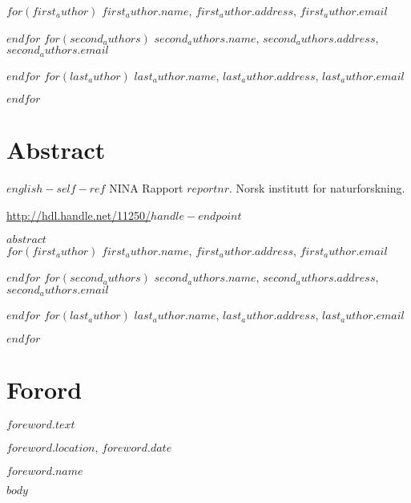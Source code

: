 \documentclass[11pt, a4paper]{article}
\renewcommand*{\href}[2]{\hyperref[#1]{\color{darkblue}\setulcolor{darkblue}\ul{#2}}}
\begin{document}
\vspace{1cm}
\small
$for(first_author)$
$first_author.name$, $first_author.address$, $first_author.email$  \par
$endfor$
$for(second_authors)$
$second_authors.name$, $second_authors.address$, $second_authors.email$  \par
$endfor$
$for(last_author)$
$last_author.name$, $last_author.address$, $last_author.email$  \par
$endfor$
\normalsize
\clearpage

\setcounter{secnumdepth}{0}
\section{Abstract}
\small{$english-self-ref$} NINA Rapport $reportnr$. Norsk institutt for naturforskning. \par\href{http://hdl.handle.net/11250/$handle-endpoint$}{http://hdl.handle.net/11250/$handle-endpoint$}\par
\vspace{0.5cm}
\normalsize{
$abstract$} \\

\vspace{1cm}
\small
$for(first_author)$
$first_author.name$, $first_author.address$, $first_author.email$  \par
$endfor$
$for(second_authors)$
$second_authors.name$, $second_authors.address$, $second_authors.email$  \par
$endfor$
$for(last_author)$
$last_author.name$, $last_author.address$, $last_author.email$  \par
$endfor$
\normalsize
\clearpage


\doublespacing
\tableofcontents
{}
\singlespacing
\clearpage

\section{Forord}

\normalsize
$foreword.text$\par
\medskip
$foreword.location$, $foreword.date$\par
\medskip
$foreword.name$



\clearpage
\setcounter{secnumdepth}{4}
\setlength{\parskip}{6pt}

$body$


\end{document}
